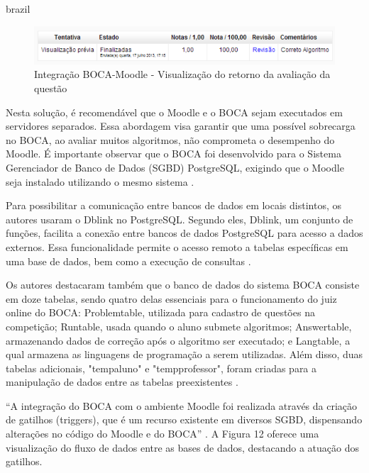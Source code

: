 \begin{otherlanguage*}{brazil}
\begin{figure}[h!]
	   \centering
            \caption{Integração BOCA-Moodle - Visualização do retorno da avaliação da questão}
            \label{fig:ModeloConceitual}
	   	\includegraphics[scale=0.3]{pictures/BOCA_visualizacao.png}
\end{figure}

Nesta solução, é recomendável que o Moodle e o BOCA sejam executados em servidores separados. Essa abordagem visa garantir que uma possível sobrecarga no BOCA, ao avaliar muitos algoritmos, não comprometa o desempenho do Moodle. É importante observar que o BOCA foi desenvolvido para o Sistema Gerenciador de Banco de Dados (SGBD) PostgreSQL, exigindo que o Moodle seja instalado utilizando o mesmo sistema \cite[p.~27-28]{galasso}. 

Para possibilitar a comunicação entre bancos de dados em locais distintos, os autores usaram o Dblink no PostgreSQL. Segundo eles, Dblink, um conjunto de funções, facilita a conexão entre bancos de dados PostgreSQL para acesso a dados externos. Essa funcionalidade permite o acesso remoto a tabelas específicas em uma base de dados, bem como a execução de consultas \cite[p.~27-28]{galasso}.

Os autores destacaram também que o banco de dados do sistema BOCA consiste em doze tabelas, sendo quatro delas essenciais para o funcionamento do juiz online do BOCA: Problemtable, utilizada para cadastro de questões na competição; Runtable, usada quando o aluno submete algoritmos; Answertable, armazenando dados de correção após o algoritmo ser executado; e Langtable, a qual armazena as linguagens de programação a serem utilizadas. Além disso, duas tabelas adicionais, "tempaluno" e "tempprofessor", foram criadas para a manipulação de dados entre as tabelas preexistentes \cite[p.~27-28]{galasso}. 

“A integração do BOCA com o ambiente Moodle foi realizada através da criação de gatilhos (triggers), que é um recurso existente em diversos SGBD, dispensando alterações no código do Moodle e do BOCA” \cite[p.~28-29]{galasso}. A Figura 12 oferece uma visualização do fluxo de dados entre as bases de dados, destacando a atuação dos gatilhos.


\end{otherlanguage*}
